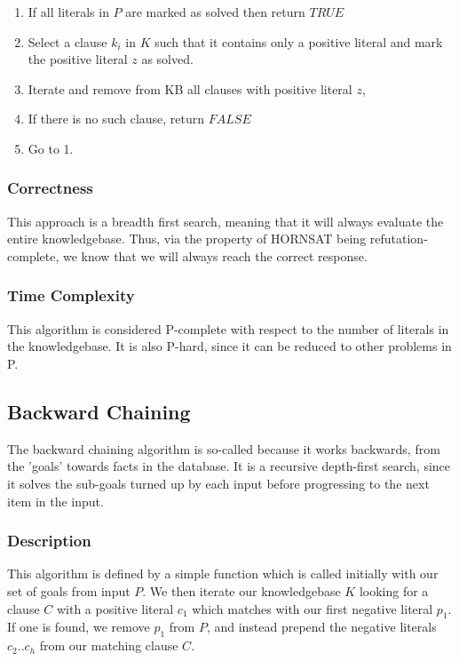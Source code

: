 \documentclass{article}
\begin{document}
\begin{enumerate}
  \item If all literals in $P$ are marked as solved then return $TRUE$
  \item Select a clause $k_i$ in $K$ such that it contains only a positive
  literal and mark the positive literal $z$ as solved.
  \item Iterate and remove from KB all clauses with positive literal $z$,
  \item If there is no such clause, return $FALSE$
  \item Go to 1.
\end{enumerate}

\subsubsection{Correctness}

This approach is a breadth first search, meaning that it will always evaluate
the entire knowledgebase. Thus, via the property of HORNSAT being
refutation-complete, we know that we will always reach the correct response.\cite{proofcomp}

\subsubsection{Time Complexity}

This algorithm is considered P-complete with respect to the number of literals
in the knowledgebase. It is also P-hard, since it can be reduced to other
problems in P.\cite{proofcomp}

\subsection{Backward Chaining}

The backward chaining algorithm is so-called because it works backwards, from the
'goals' towards facts in the database. It is a recursive depth-first search, since 
it solves the sub-goals turned up by each input before progressing to the next 
item in the input.

\subsubsection{Description}

This algorithm is defined by a simple function which is called initially with
our set of goals from input $P$. We then iterate our knowledgebase $K$ looking for a
clause $C$ with a positive literal $c_1$ which matches with our first negative
literal $p_1$. If one is found, we remove $p_1$ from $P$, and instead prepend
the negative literals $c_2 .. c_h$ from our matching clause $C$.
\end{document}
